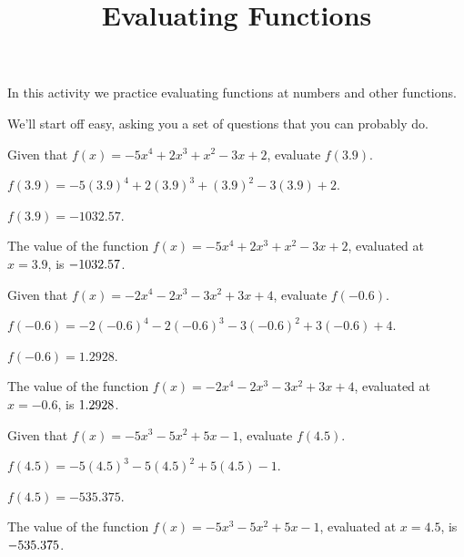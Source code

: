 \documentclass{ximera}
\begin{document}
\title{Evaluating Functions}
\maketitle


\begin{headline} %
In this activity we practice evaluating functions at numbers and other
functions.
\end{headline}


We'll start off easy, asking you a set of questions that you can
probably do.


\begin{shuffle}
\begin{exercise}
Given that $f(x)=-5 x^4+2 x^3+x^2-3 x+2$, evaluate $f(3.9)$.
\begin{solution}
\begin{hint}
$f(3.9)=-5 (3.9)^4+2 (3.9)^3+(3.9)^2-3 (3.9)+2$.
\end{hint}
\begin{hint}
$f(3.9)=-1032.57$.
\end{hint}
The value of the function $f(x) = -5 x^4+2 x^3+x^2-3 x+2$, evaluated at $x=3.9$, is ${-1032.57}$.
\end{solution}
\end{exercise}

\begin{exercise}
Given that $f(x)=-2 x^4-2 x^3-3 x^2+3 x+4$, evaluate $f(-0.6)$.
\begin{solution}
\begin{hint}
$f(-0.6)=-2 (-0.6)^4-2 (-0.6)^3-3 (-0.6)^2+3 (-0.6)+4$.
\end{hint}
\begin{hint}
$f(-0.6)=1.2928$.
\end{hint}
The value of the function $f(x) = -2 x^4-2 x^3-3 x^2+3 x+4$, evaluated at $x=-0.6$, is ${1.2928}$.
\end{solution}
\end{exercise}

\begin{exercise}
Given that $f(x)=-5 x^3-5 x^2+5 x-1$, evaluate $f(4.5)$.
\begin{solution}
\begin{hint}
$f(4.5)=-5 (4.5)^3-5 (4.5)^2+5 (4.5)-1$.
\end{hint}
\begin{hint}
$f(4.5)=-535.375$.
\end{hint}
The value of the function $f(x) = -5 x^3-5 x^2+5 x-1$, evaluated at $x=4.5$, is ${-535.375}$.
\end{solution}
\end{exercise}


\end{shuffle}
\end{document}
